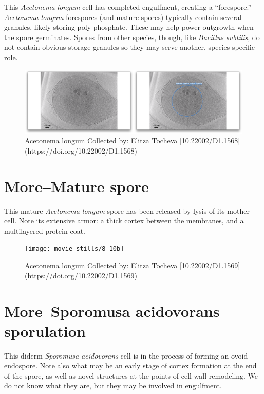 \documentclass[]{tufte-book}
\begin{document}
This \emph{Acetonema longum} cell has completed engulfment, creating a
``forespore.'' \emph{Acetonema longum} forespores (and mature spores)
typically contain several granules, likely storing poly-phosphate. These
may help power outgrowth when the spore germinates. Spores from other
species, though, like \emph{Bacillus subtilis}, do not contain obvious
storage granules so they may serve another, species-specific role.

\begin{figure}
\includegraphics{movie_stills/8_10a} \caption[Acetonema longum Collected by]{Acetonema longum Collected by: Elitza Tocheva [10.22002/D1.1568](https://doi.org/10.22002/D1.1568)}\label{fig:unnamed-chunk-147}
\end{figure}

\hypertarget{moremature-spore}{\section{More--Mature
spore}\label{moremature-spore}}

This mature \emph{Acetonema longum} spore has been released by lysis of
its mother cell. Note its extensive armor: a thick cortex between the
membranes, and a multilayered protein coat.

\begin{figure}
\texttt{[image: movie\_stills/8\_10b]} \caption[Acetonema longum Collected by]{Acetonema longum Collected by: Elitza Tocheva [10.22002/D1.1569](https://doi.org/10.22002/D1.1569)}\label{fig:unnamed-chunk-148}
\end{figure}

\hypertarget{moresporomusa-acidovorans-sporulation}{\section{More--Sporomusa
acidovorans sporulation}\label{moresporomusa-acidovorans-sporulation}}

This diderm \emph{Sporomusa acidovorans} cell is in the process of
forming an ovoid endospore. Note also what may be an early stage of
cortex formation at the end of the spore, as well as novel structures at
the points of cell wall remodeling. We do not know what they are, but
they may be involved in engulfment.
\end{document}
